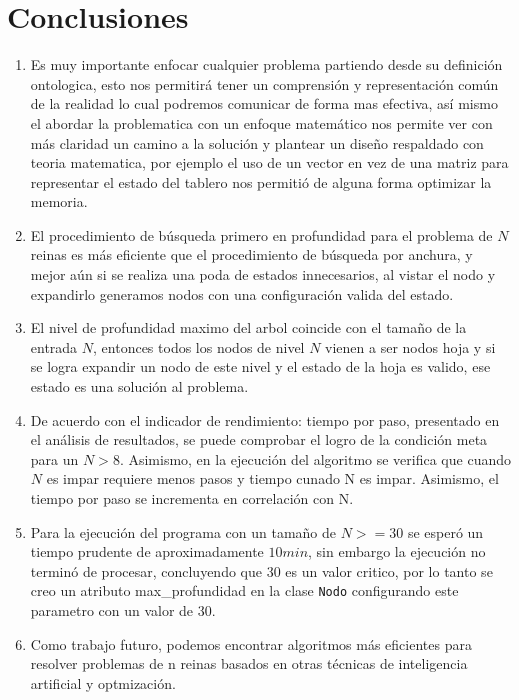 \documentclass[conference]{IEEEtran}
\begin{document}
\section{Conclusiones}
\begin{enumerate}
\item Es muy importante enfocar cualquier problema partiendo desde su definición ontologica, esto nos permitirá tener un comprensión y representación común de la realidad lo cual podremos comunicar de forma mas efectiva, así mismo el abordar la problematica con un enfoque matemático nos permite ver con más claridad un camino a la solución y plantear un diseño respaldado con teoria matematica, por ejemplo el uso de un vector en vez de una matriz para representar el estado del tablero nos permitió de alguna forma optimizar la memoria. 
\item El procedimiento de búsqueda primero en profundidad para el problema de $N$ reinas es más eficiente que el procedimiento de búsqueda por anchura, y mejor aún si se realiza una poda de estados innecesarios, al vistar el nodo y expandirlo generamos nodos con una configuración valida del estado.
\item El nivel de profundidad maximo del arbol coincide con el tamaño de la entrada $N$, entonces todos los nodos de nivel $N$ vienen a ser nodos hoja y si se logra expandir un nodo de este nivel y el estado de la hoja es valido, ese estado es una solución al problema.
\item De acuerdo con el indicador de rendimiento: tiempo por paso, presentado en el análisis de resultados, se puede comprobar el logro de la condición meta para un $N > 8$. Asimismo, en la ejecución del algoritmo se verifica que cuando $N$ es impar requiere menos pasos y tiempo cunado N es impar. Asimismo, el tiempo por paso se incrementa en correlación con N. 
\item Para la ejecución del programa con un tamaño de $N >= 30$ se esperó un tiempo prudente de aproximadamente $10min$, sin embargo la ejecución no terminó de procesar, concluyendo que $30$ es un valor critico, por lo tanto se creo un atributo max\_profundidad en la clase \texttt{Nodo} configurando este parametro con un valor de $30$.
\item Como trabajo futuro, podemos encontrar algoritmos más eficientes para resolver problemas de n reinas basados en otras técnicas de inteligencia artificial y optmización.

\end{enumerate}
\end{document}
